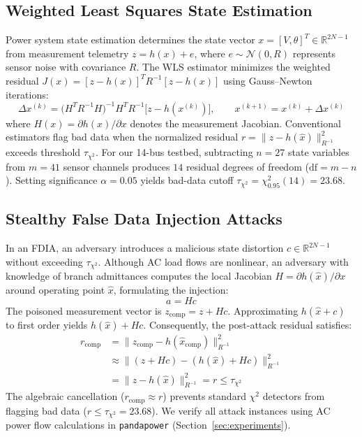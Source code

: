\documentclass[runningheads]{llncs}
\begin{document}
\subsection{Weighted Least Squares State Estimation}

Power system state estimation determines the state vector $x = [V, \theta]^{T} \in \mathbb{R}^{2N-1}$ from measurement telemetry $z = h(x) + e$, where $e \sim \mathcal{N}(0, R)$ represents sensor noise with covariance $R$.
The WLS estimator minimizes the weighted residual $J(x) = [z - h(x)]^{T} R^{-1} [z - h(x)]$ using Gauss--Newton iterations:
\begin{equation}
\Delta x^{(k)} = \bigl( H^{T} R^{-1} H \bigr)^{-1} H^{T} R^{-1} \bigl[z - h(x^{(k)})\bigr], \qquad x^{(k+1)} = x^{(k)} + \Delta x^{(k)}
\label{eq:gauss_newton}
\end{equation}
where $H(x) = \partial h(x)/\partial x$ denotes the measurement Jacobian.
Conventional estimators flag bad data when the normalized residual $r = \|z - h(\hat{x})\|^{2}_{R^{-1}}$ exceeds threshold $\tau_{\chi^{2}}$.
For our 14-bus testbed, subtracting $n=27$ state variables from $m=41$ sensor channels produces $14$ residual degrees of freedom ($\mathrm{df} = m - n$).
Setting significance $\alpha = 0.05$ yields bad-data cutoff $\tau_{\chi^{2}} = \chi^{2}_{0.95}(14) = 23.68$.

\subsection{Stealthy False Data Injection Attacks}
\label{sec:jacobian_fdia}

In an FDIA, an adversary introduces a malicious state distortion $c \in \mathbb{R}^{2N-1}$ without exceeding $\tau_{\chi^{2}}$.
Although AC load flows are nonlinear, an adversary with knowledge of branch admittances computes the local Jacobian $H = \partial h(\hat{x})/\partial x$ around operating point $\hat{x}$, formulating the injection:
\begin{equation}
a = H c
\label{eq:fdia}
\end{equation}
The poisoned measurement vector is $z_{\mathrm{comp}} = z + Hc$.
Approximating $h(\hat{x} + c)$ to first order yields $h(\hat{x}) + Hc$.
Consequently, the post-attack residual satisfies:
\begin{equation}
\begin{aligned}
r_{\mathrm{comp}} &= \|z_{\mathrm{comp}} - h(\hat{x}_{\mathrm{comp}})\|^{2}_{R^{-1}} \\
&\approx \|(z + Hc) - (h(\hat{x}) + Hc)\|^{2}_{R^{-1}} \\
&= \|z - h(\hat{x})\|^{2}_{R^{-1}} = r \leq \tau_{\chi^{2}}
\end{aligned}
\label{eq:fdia_bypass}
\end{equation}
The algebraic cancellation ($r_{\mathrm{comp}} \approx r$) prevents standard $\chi^2$ detectors from flagging bad data ($r \le \tau_{\chi^{2}} = 23.68$).
We verify all attack instances using AC power flow calculations in \texttt{pandapower} (Section~\ref{sec:experiments}).
\end{document}
